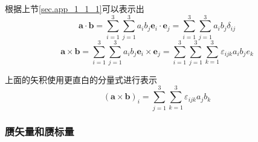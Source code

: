 				根据上节\ref{sec.app_1_1_1}可以表示出
					\begin{equation}
						\boldsymbol{a} \cdot \boldsymbol{b}=\sum_{i=1}^{3} \sum_{j=1}^{3} a_{i} b_{j} \boldsymbol{e}_{i} \cdot \boldsymbol{e}_{j}=\sum_{i=1}^{3} \sum_{j=1}^{3} a_{i} b_{j} \delta_{i j}
					\end{equation}
					\begin{equation}
						\boldsymbol{a} \times \boldsymbol{b}=\sum_{i=1}^{3} \sum_{j=1}^{3} a_{i} b_{j} \boldsymbol{e}_{i} \times \boldsymbol{e}_{j}=\sum_{i=1}^{3} \sum_{j=1}^{3} \sum_{k=1}^{3} \varepsilon_{i j k} a_{i} b_{j} e_{k}
					\end{equation}

				上面的矢积使用更直白的分量式进行表示
				\begin{equation}
					(\boldsymbol{a} \times \boldsymbol{b})_{i}=\sum_{j=1}^{3} \sum_{k=1}^{3} \varepsilon_{i j k} a_{j} b_{k}
				\end{equation}
			\subsubsection*{赝矢量和赝标量}
				








